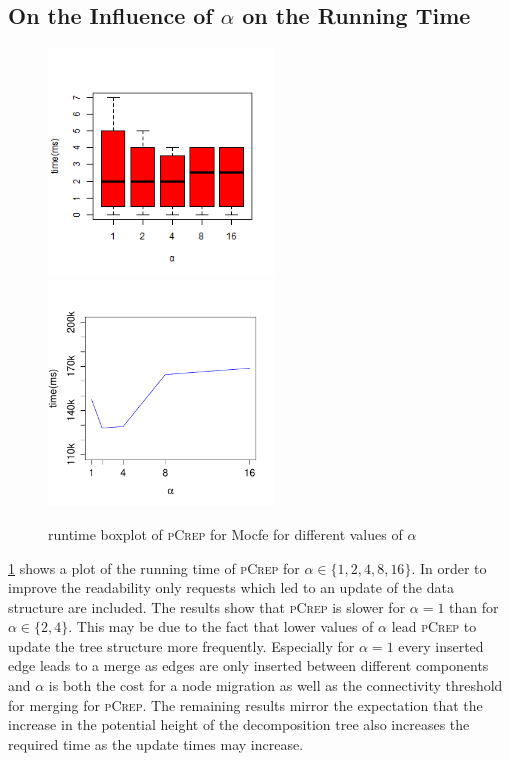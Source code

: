 \documentclass[a4paper,UKenglish,cleveref, autoref, thm-restate,authorcolumns]{lipics-v2019}
\newcommand{\adjDel}{\textsc{pCrep}}
\newcommand{\dbmocfe}{Mocfe}
\begin{document}
\subsection{On the Influence of $\alpha$ on the Running Time}
\label{sec:alpha_influence}
\begin{figure}[h]
	\centering
	\includegraphics*[height=6cm]{"plots/boxplot_varying_alphas_mocfe_filtered"}
	\includegraphics*[height=6cm]{"plots/plot_varying_alphas_mocfe"}
	\caption{runtime boxplot of \adjDel{} for \dbmocfe{} for different values of $\alpha$}
	\label{fig:alpha_influence}
\end{figure}

\cref{fig:alpha_influence} shows a plot of the running time of \adjDel{} for $\alpha\in\{1,2,4,8,16\}$. In order to improve the readability
only requests which led to an update of the data structure are included. The results show that \adjDel{} is slower for $\alpha=1$ than for $\alpha\in\{2,4\}$.
This may be due to the fact that lower values of $\alpha$ lead \adjDel{} to update the tree structure more frequently.
Especially for $\alpha=1$ every inserted edge leads to a merge as edges are only inserted between different components and $\alpha$ 
is both the cost for a node migration as well as the connectivity threshold for merging for \adjDel{}.
The remaining results mirror the expectation that the increase in the potential height of the decomposition tree also increases the required time 
as the update times may increase.
\end{document}
